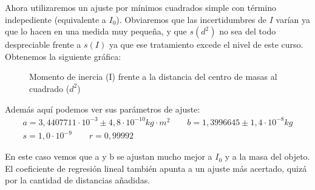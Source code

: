 \documentclass[12pt, a4paper, titlepage]{article}
\begin{document}
  Ahora utilizaremos un ajuste por mínimos cuadrados simple con término indepediente (equivalente a $I_0$). Obviaremos que las incertidumbres de $I$ varían ya que lo hacen en una medida muy pequeña, y que $s(d^2)$ no sea del todo despreciable frente a $s(I)$ ya que ese tratamiento excede el nivel de este curso. Obtenemos la siguiente gráfica:

  \begin{figure}[H]
    \hspace{3.2em} 
    \caption{Momento de inercia (I) frente a la distancia del centro de masas al cuadrado ($d^2$)}
  \end{figure}


  Además aquí podemos ver sus parámetros de ajuste:
  \begin{gather*}
    a = 3,4407711 \cdot 10^{-3} \pm 4,8 \cdot 10^{-10} kg \cdot m^2 \qquad b = 1,3996645 \pm 1,4 \cdot 10^{-8} kg \\
    s = 1,0 \cdot 10^{-9} \qquad r = 0,99992
  \end{gather*}

  En este caso vemos que a y b se ajustan mucho mejor a $I_0$ y a la masa del objeto. El coeficiente de regresión lineal también apunta a un ajuste más acertado, quizá por la cantidad de distancias añadidas.
\end{document}
